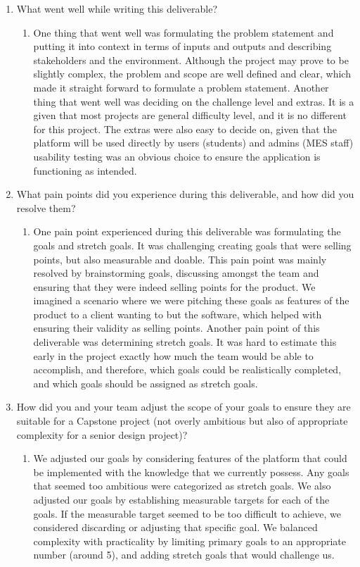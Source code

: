 \documentclass{article}
\begin{document}
\begin{enumerate}
    \item What went well while writing this deliverable? 
    \begin{enumerate}
        \item One thing that went well was formulating the problem statement and putting it into context in terms of inputs and outputs and describing stakeholders and the environment. Although the project may prove to be slightly complex, the problem and scope are well defined and clear, which made it straight forward to formulate a problem statement. Another thing that went well was deciding on the challenge level and extras. It is a given that most projects are general difficulty level, and it is no different for this project. The extras were also easy to decide on, given that the platform will be used directly by users (students) and admins (MES staff) usability testing was an obvious choice to ensure the application is functioning as intended.
    \end{enumerate}
    \item What pain points did you experience during this deliverable, and how
    did you resolve them?
    \begin{enumerate}
        \item One pain point experienced during this deliverable was formulating the goals and stretch goals. It was challenging creating goals that were selling points, but also measurable and doable. This pain point was mainly resolved by brainstorming goals, discussing amongst the team and ensuring that they were indeed selling points for the product. We imagined a scenario where we were pitching these goals as features of the product to a client wanting to but the software, which helped with ensuring their validity as selling points. Another pain point of this deliverable was determining stretch goals. It was hard to estimate this early in the project exactly how much the team would be able to accomplish, and therefore, which goals could be realistically completed, and which goals should be assigned as stretch goals.
    \end{enumerate}
    \item How did you and your team adjust the scope of your goals to ensure
    they are suitable for a Capstone project (not overly ambitious but also of
    appropriate complexity for a senior design project)?
    \begin{enumerate}
        \item We adjusted our goals by considering features of the platform that could be implemented with the knowledge that we currently possess. Any goals that seemed too ambitious were categorized as stretch goals. We also adjusted our goals by establishing measurable targets for each of the goals. If the measurable target seemed to be too difficult to achieve, we considered discarding or adjusting that specific goal. We balanced complexity with practicality by limiting primary goals to an appropriate number (around 5), and adding stretch goals that would challenge us.
    \end{enumerate}
\end{enumerate}  
\end{document}
